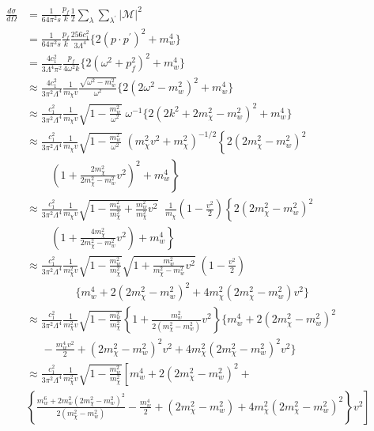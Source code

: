 \documentclass[12pt]{report}
\begin{document}
\begin{align*}
\frac{d \sigma}{d \Omega} & = \frac{1}{64 \pi^2 s} \frac{p_f}{k} \frac{1}{2} \sum_\lambda \sum_{\lambda^\prime} |\mathcal{M}|^2 \\
&=\frac{1}{64 \pi^2 s} \frac{p_f}{k}  \frac{256 c^2_1}{3\Lambda^4} \{ 2(p \cdot p^\prime)^2 +m_w^4\}\\
&= \frac{4 c^2_1}{3\Lambda^4 \pi^2} \frac{p_f}{4 \omega^2 k} \{ 2 (\omega^2 +p_f^2)^2 +m_w^4 \} \\
&\approx \frac{4c^2_1}{3 \pi^2 \Lambda^4}  \frac{1}{m_\chi v} \frac{\sqrt{\omega^2 -m^2_w}}{\omega^2} \{ 2(2 \omega^2 -m_w^2 )^2 +m_w^4 \} \\
&\approx \frac{c^2_1}{3 \pi^2 \Lambda^4}  \frac{1}{m_\chi v} \sqrt{1-\frac{m^2_w}{\omega^2}} \; \omega^{-1}  \{ 2(2k^2 + 2 m^2_\chi -m^2_w)^2 +m^4_w \}\\
&\approx \frac{c^2_1}{3 \pi^2 \Lambda^4}  \frac{1}{m_\chi v} \sqrt{1-\frac{m^2_w}{\omega^2}} \; (m^2_\chi v^2 + m^2_\chi )^{- 1/2} \left\{  2 (2m^2_\chi - m^2_w)^2 \right. \\
&\;\;\;\;\;\;\;\; \left. \left( 1+ \frac{2m^2_\chi}{2m^2_\chi - m^2_w} v^2 \right)^2 +m^4_w \right\} \\
&\approx \frac{c^2_1}{3 \pi^2 \Lambda^4}  \frac{1}{m_\chi v} \sqrt{1-\frac{m^2_w}{m^2_\chi}+\frac{m^2_w}{m^2_\chi}v^2}\; \; \frac{1}{m_\chi} \left(1-\frac{v^2}{2}\right) \left\{  2 (2m^2_\chi - m^2_w)^2 \right. \\
& \;\;\;\;\;\;\;\; \left. \left( 1+ \frac{4m^2_\chi}{2m^2_\chi - m^2_w} v^2 \right) +m^4_w \right\} \\
&\approx \frac{c^2_1}{3 \pi^2 \Lambda^4}  \frac{1}{m_\chi^2 v} \sqrt{1-\frac{m^2_w}{m^2_\chi}} \sqrt{1+\frac{m^2_w}{m^2_\chi - m^2_w} v^2}\; \left(1-\frac{v^2}{2}\right) \\
& \;\;\;\;\;\; \;\;\;\;\;\;\;\;\;\; \{ m^4_w + 2(2 m^2_\chi - m^2_w)^2 + 4m^2_\chi (2m^2_\chi -m^2_w) v^2 \}\\
&\approx \frac{c^2_1}{3 \pi^2 \Lambda^4}  \frac{1}{m^2_\chi v} \sqrt{1-\frac{m^2_w}{m^2_\chi}} \left\{ 1+\frac{m^2_w}{2(m^2_\chi-m^2_w)} v^2 \right\} \{ m^4_w + 2(2m^2_\chi - m^2_w)^2 \\
& \;\;\;\;\; - \frac{m^4_w v^2}{2} + (2 m^2_\chi - m^2_w)^2 v^2 + 4 m^2_\chi ( 2 m^2_\chi - m^2_w )^2 v^2\} \\
&\approx  \frac{c^2_1}{3 \pi^2 \Lambda^4}  \frac{1}{m^2_\chi v}  \sqrt{1-\frac{m^2_w}{m^2_\chi}} \left[ m^4_w + 2(2 m^2_\chi -m^2_w)^2 + \right. \\
& \left. \left\{ \frac{ m^6_w+2 m^2_w (2 m^2_\chi - m^2_w)^2 }{2(m^2_\chi - m^2_w)} -\frac{m^4_w}{2} + (2 m^2_\chi - m^2_w) + 4 m^2_\chi (2 m^2_\chi - m^2_w)^2 \right\} v^2 \right]
\end{align*}
\end{document}
